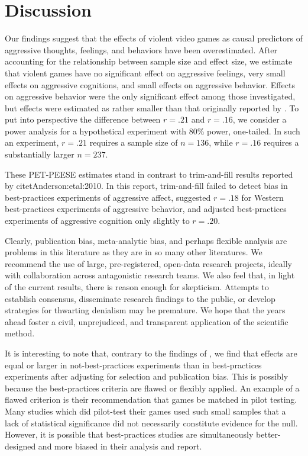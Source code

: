 \documentclass[man]{apa6}
\begin{document}
\section{Discussion}
Our findings suggest that the effects of violent video games as causal predictors of aggressive thoughts, feelings, and behaviors have been overestimated. After accounting for the relationship between sample size and effect size, we estimate that violent games have no significant effect on aggressive feelings, very small effects on aggressive cognitions, and small effects on aggressive behavior. Effects on aggressive behavior were the only significant effect among those investigated, but effects were estimated as rather smaller than that originally reported by \citet{Anderson:etal:2010}. To put into perspective the difference between $r = .21$ and $r = .16$, we consider a power analysis for a hypothetical experiment with 80\% power, one-tailed. In such an experiment, $r = .21$ requires a sample size of $n = 136$, while $r = .16$ requires a substantially larger $n = 237$. %

These PET-PEESE estimates stand in contrast to trim-and-fill results reported by citet{Anderson:etal:2010}. In this report, trim-and-fill failed to detect bias in best-practices experiments of aggressive affect, suggested $r = .18$ for Western best-practices experiments of aggressive behavior, and adjusted best-practices experiments of aggressive cognition only slightly to $r = .20$.

Clearly, publication bias, meta-analytic bias, and perhaps flexible analysis are problems in this literature as they are in so many other literatures. We recommend the use of large, pre-registered, open-data research projects, ideally with collaboration across antagonistic research teams. We also feel that, in light of the current results, there is reason enough for skepticism. Attempts to establish consensus, disseminate research findings to the public, or develop strategies for thwarting denialism may be premature. We hope that the years ahead foster a civil, unprejudiced, and transparent application of the scientific method. 

It is interesting to note that, contrary to the findings of \citet{Anderson:etal:2010}, we find that effects are equal or larger in not-best-practices experiments than in best-practices experiments after adjusting for selection and publication bias. This is possibly because the best-practices criteria are flawed or flexibly applied. An example of a flawed criterion is their recommendation that games be matched in pilot testing. Many studies which did pilot-test their games used such small samples that a lack of statistical significance did not necessarily constitute evidence for the null. %
However, it is possible that best-practices studies are simultaneously better-designed and more biased in their analysis and report. 
\end{document}
